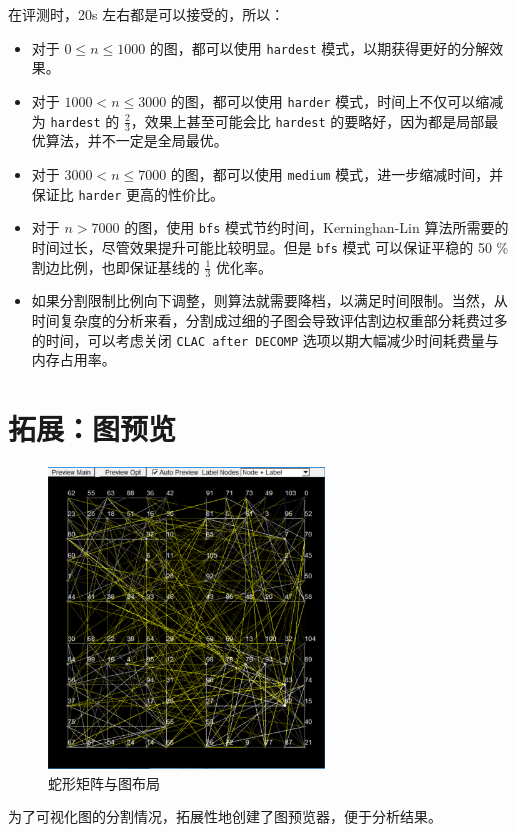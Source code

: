 \documentclass[a4paper,12pt]{article}
\begin{document}
\begin{CJK}{UTF8}{song}
在评测时，20s 左右都是可以接受的，所以：
\begin{itemize}
    \item 对于 $0\leq n\leq 1000$ 的图，都可以使用 \texttt{hardest} 模式，以期获得更好的分解效果。
    \item 对于 $1000 < n\leq 3000$ 的图，都可以使用 \texttt{harder} 模式，时间上不仅可以缩减为 \texttt{hardest} 的 $\frac{2}{3}$，效果上甚至可能会比 \texttt{hardest} 的要略好，因为都是局部最优算法，并不一定是全局最优。
    \item 对于 $3000 < n \leq 7000$ 的图，都可以使用 \texttt{medium} 模式，进一步缩减时间，并保证比 \texttt{harder} 更高的性价比。
    \item 对于 $n > 7000$ 的图，使用 \texttt{bfs} 模式节约时间，Kerninghan-Lin 算法所需要的时间过长，尽管效果提升可能比较明显。但是 \texttt{bfs} 模式 可以保证平稳的 50 \% 割边比例，也即保证基线的 $\frac{1}{3}$ 优化率。
    \item 如果分割限制比例向下调整，则算法就需要降档，以满足时间限制。当然，从时间复杂度的分析来看，分割成过细的子图会导致评估割边权重部分耗费过多的时间，可以考虑关闭 \texttt{CLAC after DECOMP} 选项以期大幅减少时间耗费量与内存占用率。
\end{itemize}

\section{拓展：图预览}

\begin{figure}[H]
  \centering
  
  \includegraphics[height=8cm]{snake.png}
  \caption{蛇形矩阵与图布局}
\end{figure}


为了可视化图的分割情况，拓展性地创建了图预览器，便于分析结果。


\end{CJK}
\end{document}
